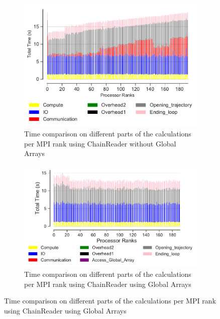 \begin{figure}[ht!]
\begin{subfigure} {.45\textwidth}
  \includegraphics[width=\linewidth]{figures/chain-reader-no-ga-BarPlot-rank-comparison_192_5.pdf}
  \captionsetup{format=hang}
   \caption{Time comparison on different parts of the calculations per MPI rank using ChainReader without Global Arrays}
  \label{fig:MPIranks-split-chain-reader}
\end{subfigure}
\hfill
\begin{subfigure} {.45\textwidth}
  \includegraphics[width=\linewidth]{figures/chain-reader-ga-BarPlot-rank-comparison_192_3.pdf}
  \captionsetup{format=hang}
  \caption{Time comparison on different parts of the calculations per MPI rank using ChainReader using Global Arrays}
  \label{fig:MPIranks-split-ga-chain-reader}
\end{subfigure}


\end{figure}
